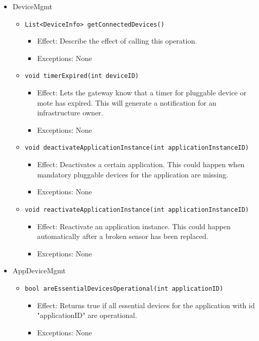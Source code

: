 \begin{itemize}
            \item DeviceMgmt
            \begin{itemize}
                \item \texttt{List<DeviceInfo> getConnectedDevices()}
                \begin{itemize}
                    \item Effect: Describe the effect of calling this operation.
                    \item Exceptions: None
                \end{itemize}
                \item \texttt{void timerExpired(int deviceID)}
                \begin{itemize}
                    \item Effect: Lets the gateway know that a timer for pluggable device or mote has expired.
                                  This will generate a notification for an infrastructure owner.
                    \item Exceptions: None
                \end{itemize}
                \item \texttt{void deactivateApplicationInstance(int applicationInstanceID)}
                \begin{itemize}
                    \item Effect: Deactivates a certain application. This could happen when
                                  mandatory pluggable devices for the application are missing.
                    \item Exceptions: None
                \end{itemize}
                \item \texttt{void reactivateApplicationInstance(int applicationInstanceID)}
                \begin{itemize}
                    \item Effect: Reactivate an application instance. This could happen
                                  automatically after a broken sensor has been replaced.
                    \item Exceptions: None
                \end{itemize}
            \end{itemize}

            \item AppDeviceMgmt
            \begin{itemize}
                \item \texttt{bool areEssentialDevicesOperational(int applicationID)}
                \begin{itemize}
                    \item Effect: Returns true if all essential devices for the application
                                  with id "applicationID" are operational.
                    \item Exceptions: None
                \end{itemize}
            \end{itemize}
        \end{itemize}

